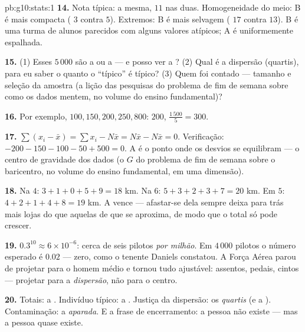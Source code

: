 \begin{solution}{pb:g10:stats:1}
\textbf{14.} Nota típica: a mesma,  $11$ nas duas.
Homogeneidade do meio: B é mais compacta ( $3$ contra $5$). Extremos: B é mais selvagem
( $17$ contra $13$). B é uma turma de alunos
parecidos com alguns valores atípicos; A é uniformemente
espalhada.

\textbf{15.} (1) Esses $5\,000$ são a  ou a  --- e
posso ver a ? (2) Qual é a dispersão (quartis), para eu
saber o quanto o ``típico'' é típico? (3) Quem foi contado ---
tamanho e seleção da amostra (a lição das pesquisas do problema
de fim de semana sobre como os dados mentem, no volume do
ensino fundamental)?

\textbf{16.} Por exemplo, $100, 150, 200, 250, 800$: 
$200$,  $\frac{1\,500}{5} = 300$.

\textbf{17.} $\sum (x_i - \bar x) = \sum x_i - N \bar x =
N\bar x - N\bar x = 0$. Verificação:
$-200 - 150 - 100 - 50 + 500 = 0$. A  é o ponto onde os
desvios se equilibram --- o centro de gravidade dos dados (o
$G$ do problema de fim de semana sobre o baricentro, no volume
do ensino fundamental, em uma dimensão).

\textbf{18.} Na  $4$: $3 + 1 + 0 + 5 + 9 = 18$ km. Na
 $6$: $5 + 3 + 2 + 3 + 7 = 20$ km. Em $5$:
$4 + 2 + 1 + 4 + 8 = 19$ km. A  vence --- afastar-se
dela sempre deixa para trás mais lojas do que aquelas de que se
aproxima, de modo que o total só pode crescer.

\textbf{19.} $0.3^{10} \approx 6 \times 10^{-6}$: cerca de seis
pilotos \emph{por milhão}. Em $4\,000$ pilotos o número
esperado é $0.02$ --- zero, como o tenente Daniels constatou. A
Força Aérea parou de projetar para o homem médio e tornou tudo
ajustável: assentos, pedais, cintos --- projetar para a
\emph{dispersão}, não para o centro.

\textbf{20.} Totais: a \emph{}. Indivíduo típico: a
\emph{}. Justiça da dispersão: os \emph{quartis} (e a
). Contaminação: a \emph{ aparada}.
E a frase de encerramento: a pessoa  não existe --- mas a
pessoa  quase existe.
\end{solution}
